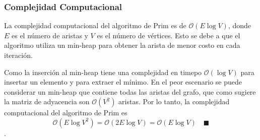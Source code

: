 \documentclass[12pt]{article}
\begin{document}
    \subsubsection{Complejidad Computacional}
    La complejidad computacional del algoritmo de Prim es de $\mathcal{O}(E\log V)$, donde $E$ es el número de aristas
    y $V$ es el número de vértices. Esto se debe a que el algoritmo utiliza un min-heap para obtener la arista
    de menor costo en cada iteración. 
    
    Como la inserción al min-heap tiene una complejidad en timepo $\mathcal{O}(\log V)$ para insertar un elemento y para extraer el mínimo. 
    En el peor escenario se puede considerar un min-heap que contiene todas las aristas del grafo, que como sugiere la matriz de adyacencia
    son $\mathcal{O}(V^2)$ aristas. Por lo tanto, la complejidad computacional del algoritmo de Prim es 
    $$\mathcal{O}(E\log V^{2}) = \mathcal{O}(2E\log V) = \mathcal{O}(E\log V) \quad \blacksquare$$.
\end{document}
